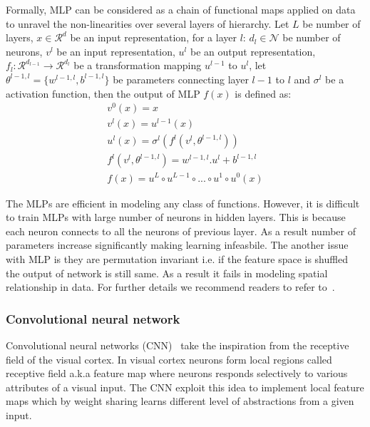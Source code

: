 Formally, MLP can be considered as a chain of functional maps applied on data to unravel the non-linearities over several layers of hierarchy. Let $L$ be number of layers, $x\in\mathcal{R}^d$ be an input representation, for a layer $l$: $d_l\in\mathcal{N}$ be number of neurons, $v^{l}$ be an input representation, $u^{l}$ be an output representation, $f_l:\mathcal{R}^{d_{l-1}}
\rightarrow\mathcal{R}^{d_{l}}$ be a transformation mapping $u^{l-1}$ to  $u^l$, let $\theta^{l-1,l}=\{w^{l-1,l},b^{l-1,l}\}$ be parameters connecting layer $l-1$ to $l$ and $\sigma^{l}$ be a activation function, then the output of MLP $f(x)$ is defined as:
\begin{equation}
\label{eq:mlp}
\begin{aligned}
    v^{0}(x) = x\\
    v^{l}(x) = u^{l-1}(x)\\
    u^{l}(x) = \sigma^l(f^{l}(v^{l},\theta^{l-1, l}))\\
    f^{l}(v^{l},\theta^{l-1, l}) = w^{l-1, l}.u^{l}+b^{l-1,l}\\
    f(x) = u^{L}\circ u^{L-1}\circ...\circ u^{1}\circ u^{0}(x)
\end{aligned}
\end{equation}

The MLPs are efficient in modeling any class of functions. However, it is difficult to train MLPs with large number of neurons in hidden layers. This is because each neuron connects to all the neurons of previous layer. As a result number of parameters increase significantly making learning infeasbile. The another issue with MLP is they are permutation invariant i.e. if the feature space is shuffled the output of network is still same. As a result it fails in modeling spatial relationship in data. For further details we recommend readers to refer to~\cite{Goodfellow-et-al-2016}.


\subsubsection{Convolutional neural network}
\label{sub:cnn}
Convolutional neural networks (CNN)~\cite{lecun1995convolutional} take the inspiration from the receptive field of the visual cortex. In visual cortex neurons form local regions called receptive field a.k.a feature map where neurons responds selectively to various attributes of a visual input. The CNN exploit this idea to  implement local feature maps which by weight sharing learns different level of abstractions from a given input.  

